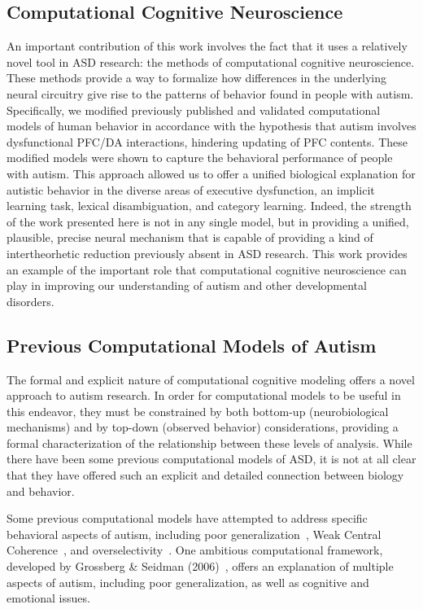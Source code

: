 %
%

\subsection{Computational Cognitive Neuroscience}
An important contribution of this work involves the fact that it uses a relatively novel tool in ASD research: the methods of computational cognitive neuroscience. These methods provide a way to formalize how differences in the underlying neural circuitry give rise to the patterns of behavior found in people with autism. Specifically, we modified previously published and validated computational models of human behavior in accordance with the hypothesis that autism involves dysfunctional PFC/DA interactions, hindering updating of PFC contents. These modified models were shown to capture the behavioral performance of people with autism. This approach allowed us to offer a unified biological explanation for autistic behavior in the diverse areas of executive dysfunction, an implicit learning task, lexical disambiguation, and category learning. Indeed, the strength of the work presented here is not in any single model, but in providing a unified, plausible, precise neural mechanism that is capable of providing a kind of intertheorhetic reduction previously absent in ASD research. This work provides an example of the important role that computational cognitive neuroscience can play in improving our understanding of autism and other developmental disorders.

\subsection{Previous Computational Models of Autism}
The formal and explicit nature of computational cognitive modeling offers a novel approach to autism research. In order for computational models to be useful in this endeavor, they must be constrained by both bottom-up (neurobiological mechanisms) and by top-down (observed behavior) considerations, providing a formal characterization of the relationship between these levels of analysis. While there have been some previous computational models of ASD, it is not at all clear that they have offered such an explicit and detailed connection between biology and behavior.

Some previous computational models have attempted to address specific behavioral aspects of autism, including poor generalization~\cite{CohenIL:1994:AutismLearning,GustafssonL:1997:AutismMaps}, Weak Central Coherence~\cite{OLoughlinC:2000:Coherence}, and overselectivity~\cite{McClellandJL:2000:Autism}. One ambitious computational framework, developed by Grossberg \& Seidman (2006)~\nocite{GrossbergS:2006:Autism}, offers an explanation of multiple aspects of autism, including poor generalization, as well as cognitive and emotional issues.

